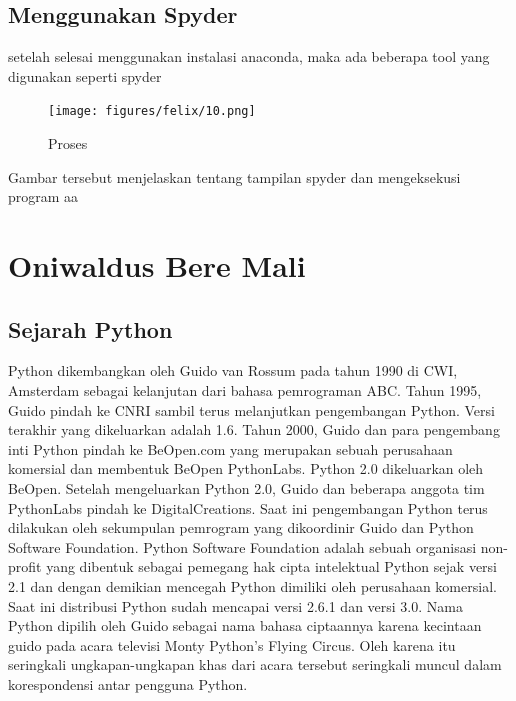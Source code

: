 \subsection{Menggunakan Spyder}
setelah selesai menggunakan instalasi anaconda,  maka ada beberapa tool yang digunakan seperti spyder
\begin{figure}[!htbp]
        \centering
        \texttt{[image: figures/felix/10.png]}
        \caption{Proses}
        \label{awal}
        \end{figure}

Gambar tersebut menjelaskan tentang tampilan spyder dan mengeksekusi program aa



\section{Oniwaldus Bere Mali}
\subsection{Sejarah Python}
              Python dikembangkan oleh Guido van Rossum pada tahun 1990 di CWI, Amsterdam sebagai kelanjutan dari bahasa pemrograman ABC. Tahun 1995, Guido pindah ke CNRI sambil terus melanjutkan pengembangan Python. Versi terakhir yang dikeluarkan adalah 1.6. Tahun 2000, Guido dan para pengembang inti Python pindah ke BeOpen.com yang merupakan sebuah perusahaan komersial dan membentuk BeOpen PythonLabs. Python 2.0 dikeluarkan oleh BeOpen. Setelah mengeluarkan Python 2.0, Guido dan beberapa anggota tim PythonLabs pindah ke DigitalCreations. Saat ini pengembangan Python terus dilakukan oleh sekumpulan pemrogram yang dikoordinir Guido dan Python Software Foundation. Python Software Foundation adalah sebuah organisasi non-profit yang dibentuk sebagai pemegang hak cipta intelektual Python sejak versi 2.1 dan dengan demikian mencegah Python dimiliki oleh perusahaan komersial. Saat ini distribusi Python sudah mencapai versi 2.6.1 dan versi 3.0. Nama Python dipilih oleh Guido sebagai nama bahasa ciptaannya karena kecintaan guido pada acara televisi Monty Python's Flying Circus. Oleh karena itu seringkali ungkapan-ungkapan khas dari acara tersebut seringkali muncul dalam korespondensi antar pengguna Python.

